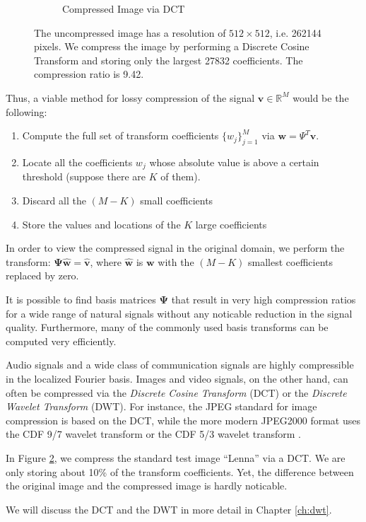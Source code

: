 \begin{figure}
\begin{subfigure}[b]{0.4\textwidth}
    \caption{Compressed Image via DCT}
    \label{fig:ch2:lenna_dct}
  \end{subfigure}
  \caption[Image Compression using DCT]{The uncompressed image has a resolution of $512\times 512$, i.e. 262144 pixels. We compress the image by performing a Discrete Cosine Transform and storing only the largest 27832 coefficients. The compression ratio is 9.42.}
  \label{fig:ch2:dct}
\end{figure}

Thus, a viable method for lossy compression of the signal $\bm v \in \mathbb{R}^M$ would be the following:
\begin{enumerate}
\item Compute the full set of transform coefficients $\{w_j\}_{j=1}^M$ via $\bm w = \Psi^T\bm v$.
\item Locate all the coefficients $w_j$ whose absolute value is above a certain threshold (suppose there are $K$ of them). 
\item Discard all the $(M-K)$ small coefficients
\item Store the values and locations of the $K$ large coefficients
\end{enumerate}
In order to view the compressed signal in the original domain, we perform the transform: $\bm\Psi\bm{\hat w} = \bm{\hat v}$, where $\bm{\hat w}$ is $\bm w$ with the $(M-K)$ smallest coefficients replaced by zero.

It is possible to find basis matrices $\bm\Psi$ that result in very high compression ratios for a wide range of natural signals without any noticable reduction in the signal quality.
Furthermore, many of the commonly used basis transforms can be computed very efficiently.

Audio signals and a wide class of communication signals are highly compressible in the localized Fourier basis.
Images and video signals, on the other hand, can often be compressed via the \emph{Discrete Cosine Transform} (DCT) or the \emph{Discrete Wavelet Transform} (DWT).
For instance, the JPEG standard for image compression is based on the DCT, while the more modern JPEG2000 format uses the CDF 9/7 wavelet transform or the CDF 5/3 wavelet transform \cite{taubman2012}.

In Figure \ref{fig:ch2:dct}, we compress the standard test image ``Lenna'' via a DCT. 
We are only storing about 10\% of the transform coefficients.
Yet, the difference between the original image and the compressed image is hardly noticable.

We will discuss the DCT and the DWT in more detail in Chapter \ref{ch:dwt}.


